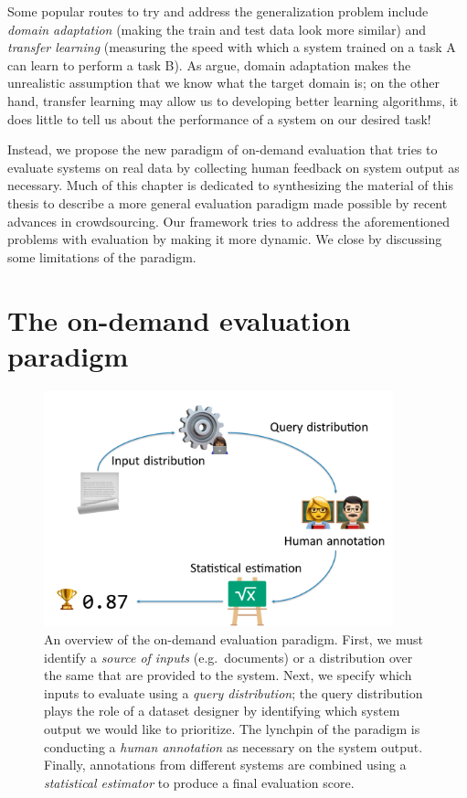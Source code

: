 Some popular routes to try and address the generalization problem include \textit{domain adaptation} (making the train and test data look more similar) and \textit{transfer learning} (measuring the speed with which a system trained on a task A can learn to perform a task B).
As \citet{plank16nonstandard} argue, domain adaptation makes the unrealistic assumption that we know what the target domain is;
  on the other hand, transfer learning may allow us to developing better learning algorithms, it does little to tell us about the performance of a system on our desired task!

Instead, we propose the new paradigm of on-demand evaluation that tries to evaluate systems on real data by collecting human feedback on system output as necessary.
Much of this chapter is dedicated to synthesizing the material of this thesis to describe a more general evaluation paradigm made possible by recent advances in crowdsourcing.
Our framework tries to address the aforementioned problems with evaluation by making it more dynamic.
We close by discussing some limitations of the paradigm.

\section{The on-demand evaluation paradigm}

\begin{figure}
  \centering
  \includegraphics[width=0.9\textwidth]{figures/overview}
  \caption[Overview of the on-demand evaluation paradigm]{\label{fig:conclusions:overview}
  An overview of the on-demand evaluation paradigm. 
  First, we must identify a \textit{source of inputs} (e.g.\ documents) or a distribution over the same that are provided to the system.
  Next, we specify which inputs to evaluate using a \textit{query distribution}; the query distribution plays the role of a dataset designer by identifying which system output we would like to prioritize.
  The lynchpin of the paradigm is conducting a \textit{human annotation} as necessary on the system output. 
  Finally, annotations from different systems are combined using a \textit{statistical estimator} to produce a final evaluation score.
  }
\end{figure}

